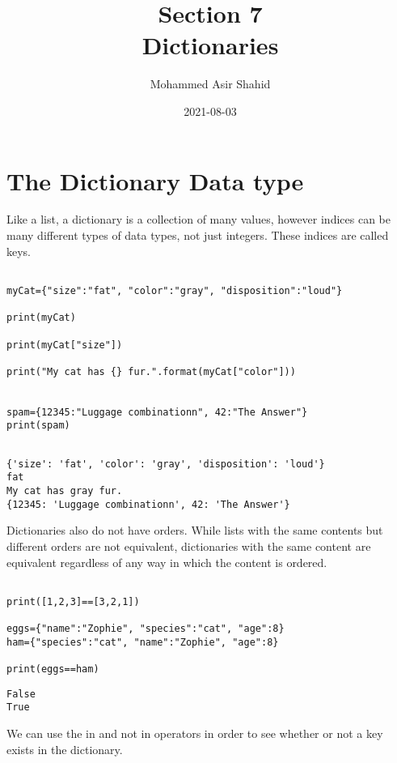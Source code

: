\documentclass[11pt]{article}
\author{Mohammed Asir Shahid}
\date{2021-08-03}
\title{Section 7\\\medskip
\large Dictionaries}
\begin{document}
\maketitle
\tableofcontents


\section{The Dictionary Data type}
\label{sec:orgadb6a16}

Like a list, a dictionary is a collection of many values, however indices can be many different types of data types, not just integers. These indices are called keys.

\begin{verbatim}

myCat={"size":"fat", "color":"gray", "disposition":"loud"}

print(myCat)

print(myCat["size"])

print("My cat has {} fur.".format(myCat["color"]))


spam={12345:"Luggage combinationn", 42:"The Answer"}
print(spam)


\end{verbatim}

\begin{verbatim}
{'size': 'fat', 'color': 'gray', 'disposition': 'loud'}
fat
My cat has gray fur.
{12345: 'Luggage combinationn', 42: 'The Answer'}
\end{verbatim}


Dictionaries also do not have orders. While lists with the same contents but different orders are not equivalent, dictionaries with the same content are equivalent regardless of any way in which the content is ordered.


\begin{verbatim}

print([1,2,3]==[3,2,1])

eggs={"name":"Zophie", "species":"cat", "age":8}
ham={"species":"cat", "name":"Zophie", "age":8}

print(eggs==ham)

\end{verbatim}

\begin{verbatim}
False
True
\end{verbatim}


We can use the in and not in operators in order to see whether or not a key exists in the dictionary.
\end{document}
